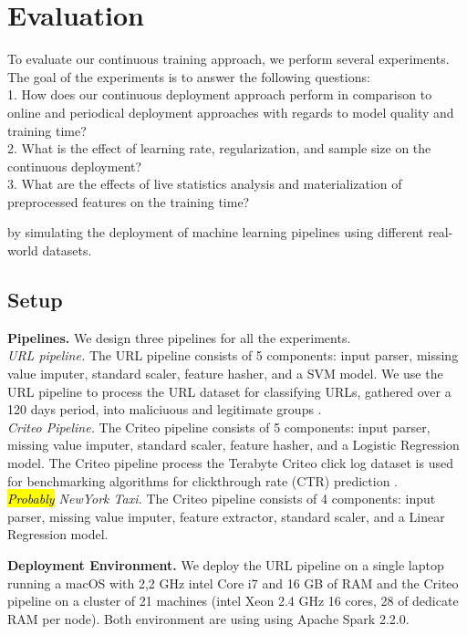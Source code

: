\section{Evaluation} \label{evaluation} 
To evaluate our continuous training approach, we perform several experiments.
The goal of the experiments is to answer the following questions:\\
1. How does our continuous deployment approach perform in comparison to online and periodical deployment approaches with regards to model quality and training time? \\
2. What is the effect of learning rate, regularization, and sample size on the continuous deployment? \\
3. What are the effects of live statistics analysis and materialization of preprocessed features on the training time?

by simulating the deployment of machine learning pipelines using different real-world datasets.

\subsection{Setup}\label{subsec:setup}
\textbf{Pipelines.}
We design three pipelines for all the experiments.\\
\textit{URL pipeline. } The URL pipeline consists of 5 components: input parser, missing value imputer, standard scaler, feature hasher, and a SVM model.
We use the URL pipeline to process the URL dataset for classifying URLs, gathered over a 120 days period, into maliciuous and legitimate groups \cite{ma2009identifying}.\\
\textit{Criteo Pipeline.} 
The Criteo pipeline consists of 5 components: input parser, missing value imputer, standard scaler, feature hasher, and a Logistic Regression model.
The Criteo pipeline process the Terabyte Criteo click log dataset is used for benchmarking algorithms for clickthrough rate (CTR) prediction \cite{criteo-log}.\\
\textit{\hl{Probably} NewYork Taxi.}
The Criteo pipeline consists of 4 components: input parser, missing value imputer, feature extractor, standard scaler, and a Linear Regression model.

\textbf{Deployment Environment. }
We deploy the URL pipeline on a single laptop running a macOS with 2,2 GHz intel Core i7 and 16 GB of RAM and the Criteo pipeline on a cluster of 21 machines (intel Xeon 2.4 GHz 16 cores, 28 of dedicate RAM per node).
Both environment are using using Apache Spark 2.2.0.

